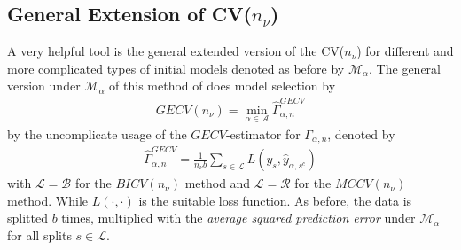 \documentclass[Research_Module_ES.tex]{subfiles}
\begin{document}
	







\subsection{General Extension of CV($n_\nu$)}
A very helpful tool is the general extended version of the CV($n_\nu$) for different and more complicated types of initial models denoted as before by $\mathcal{M}_\alpha$. The general version under $\mathcal{M}_\alpha$ of this method of \cite{shao} does model selection by 
\begin{align*}
	GECV(n_\nu)=\min_{\alpha\in\mathcal{A}}\hat{\Gamma}_{\alpha,n}^{GECV}
\end{align*}
by the uncomplicate usage of the $GECV$-estimator for $\Gamma_{\alpha,n}$, denoted by
\begin{align*}
	\hat{\Gamma}_{\alpha,n}^{GECV}=\frac{1}{n_\nu b}\sum_{s\in\mathcal{L}}L(y_s,\hat{y}_{\alpha,s^c})
\end{align*} 
with $\mathcal{L}=\mathcal{B}$ for the $BICV(n_\nu)$ method and $\mathcal{L}=\mathcal{R}$ for the $MCCV(n_\nu)$ method. While $L(\cdot,\cdot)$ is the suitable loss function. As before, the data is splitted $b$ times, multiplied with the \textit{average squared prediction error} under $\mathcal{M}_\alpha$ for all splits $s\in\mathcal{L}$.
\end{document}
